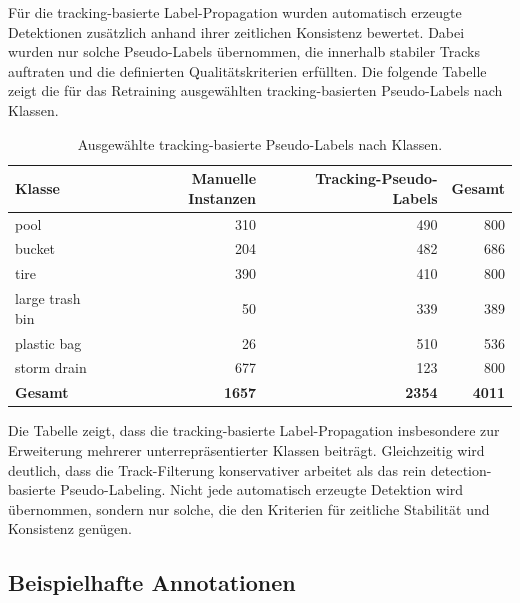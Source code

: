 Für die tracking-basierte Label-Propagation wurden automatisch erzeugte
Detektionen zusätzlich anhand ihrer zeitlichen Konsistenz bewertet. Dabei wurden
nur solche Pseudo-Labels übernommen, die innerhalb stabiler Tracks auftraten und
die definierten Qualitätskriterien erfüllten. Die folgende Tabelle zeigt die für das
Retraining ausgewählten tracking-basierten Pseudo-Labels nach Klassen.

\begin{table}[H]
    \centering
    \caption{Ausgewählte tracking-basierte Pseudo-Labels nach Klassen.}
    \label{tab:anhang_tracking_distribution}
    \begin{tabular}{lrrr}
        \toprule
        \textbf{Klasse}                 & \textbf{Manuelle Instanzen} &
        \textbf{Tracking-Pseudo-Labels} & \textbf{Gesamt}                                             \\
        \midrule
        pool                            & 310                         & 490           & 800           \\
        bucket                          & 204                         & 482           & 686           \\
        tire                            & 390                         & 410           & 800           \\
        large trash bin                 & 50                          & 339           & 389           \\
        plastic bag                     & 26                          & 510           & 536           \\
        storm drain                     & 677                         & 123           & 800           \\
        \midrule
        \textbf{Gesamt}                 & \textbf{1657}               & \textbf{2354} & \textbf{4011} \\
        \bottomrule
    \end{tabular}
\end{table}

Die Tabelle zeigt, dass die tracking-basierte Label-Propagation insbesondere zur
Erweiterung mehrerer unterrepräsentierter Klassen beiträgt. Gleichzeitig wird
deutlich, dass die Track-Filterung konservativer arbeitet als das rein
detection-basierte Pseudo-Labeling. Nicht jede automatisch erzeugte Detektion
wird übernommen, sondern nur solche, die den Kriterien für zeitliche Stabilität und
Konsistenz genügen.

\subsection{Beispielhafte Annotationen}

